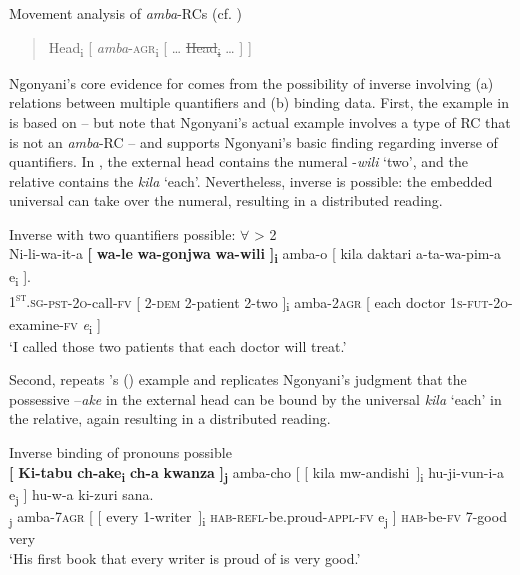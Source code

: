 \documentclass[output=paper,modfonts,nonflat,hidelinks]{langsci/langscibook}
\begin{document}
\ea\label{ex:gould:5}Movement analysis of \textit{amba}{}-RCs (cf. \citealt{Ngonyani2006})\\
\begin{quote}
Head\textsubscript{i} [ \textit{amba}{}-\textsc{agr}\textsubscript{i} [ … \sout{Head\textsubscript{i}} … ] ]
\end{quote}
\z

Ngonyani’s core evidence for  comes from the possibility of inverse  involving (a)  relations between multiple quantifiers and (b) binding data. First, the example in  is based on \citet[66]{Ngonyani2001} – but note that Ngonyani’s actual example involves a type of RC that is not an \textit{amba}{}-RC – and supports Ngonyani’s basic finding regarding inverse  of quantifiers. In , the external head contains the numeral -\textit{wili} ‘two’, and the relative contains the  \textit{kila} ‘each’. Nevertheless, inverse  is possible: the embedded universal can take  over the numeral, resulting in a distributed reading.

\ea\label{ex:gould:6}Inverse  with two quantifiers possible:  $\forall$ > 2\\
\gll Ni-li-wa-it-a \textbf{[} \textbf{wa-le} \textbf{wa-gonjwa} \textbf{wa-wili} \textbf{]\textsubscript{i}} amba-o [ kila daktari a-ta-wa-pim-a e\textsubscript{i} ].\\
\textsc{1\textsuperscript{st}.sg}\textsc{{}-pst-2o}{}-call-\textsc{fv} [ \textsc{2-dem} 2-patient 2-two ]\textsubscript{i} amba{}-2\textsc{agr} [ each doctor \textsc{1s-fut-2o}{}-examine-\textsc{fv} \textit{e}\textsubscript{i} ]\\
\glt ‘I called those two patients that each doctor will treat.’
\z

Second,  repeats \citeauthor{Ngonyani2001}'s ({\citeyear[65]{Ngonyani2001}}) example and replicates Ngonyani’s judgment that the possessive  –\textit{ake} in the external head can be bound by the universal \textit{kila} ‘each’ in the relative, again resulting in a distributed reading. 

\ea\label{ex:gould:7}Inverse binding of pronouns possible\\
\gll \textbf{[} \textbf{Ki-tabu} \textbf{ch-ake\textsubscript{i}} \textbf{ch-a} \textbf{kwanza} \textbf{]\textsubscript{j}} amba-cho [ [ kila mw-andishi~]\textsubscript{i}\hspace*{-3mm} hu-ji-vun-i-a e\textsubscript{j} ] hu-w-a ki-zuri sana.\\
[ 7-book 7-\textsc{3\textsuperscript{rd}.sg.poss}\textsubscript{i} 7-of first ]\textsubscript{j} amba-\textsc{7agr} [ [ every 1-writer~]\textsubscript{i} \textsc{hab}{}-\textsc{refl}{}-be.proud-\textsc{appl}{}-\textsc{fv} e\textsubscript{j} ] \textsc{hab}{}-be-\textsc{fv} 7-good very\\
\glt ‘His first book that every writer is proud of is very good.’
\z
\end{document}
